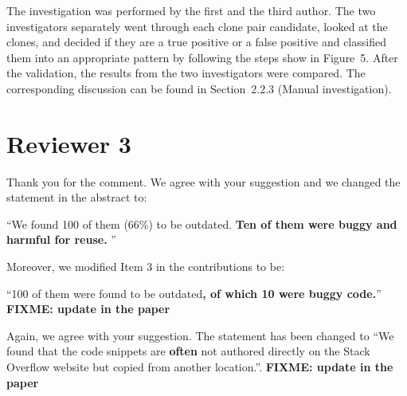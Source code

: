 \documentclass[a4paper,twoside,10pt]{reviewresponse}
\newcommand\FIXME[1]{{\color{red}\textbf{FIXME: #1}}}
\begin{document}
The investigation was performed by the first and
the third author. The two investigators separately went through each clone pair
candidate, looked at the clones, and decided if they are a true positive or a
false positive and classified them into an appropriate pattern by following the steps show in Figure~5. 
After the validation, the results from the two investigators were compared. 
The corresponding discussion can be found in Section~2.2.3 (Manual investigation).

\section{Reviewer 3}


Thank you for the comment. We agree with your suggestion and we changed the statement in the abstract to:

``We found 100 of them (66\%) to be outdated. \textbf{Ten of them were buggy and harmful for reuse.} ''

Moreover, we modified Item 3 in the contributions to be:

``100 of them were found to be outdated\textbf{, of which 10 were buggy code.}'' \FIXME{update in the paper}


Again, we agree with your suggestion. The statement has been changed to ``We found that the code snippets are \textbf{often} not authored directly on the Stack Overflow website but copied from another location.''. \FIXME{update in the paper}
\end{document}
